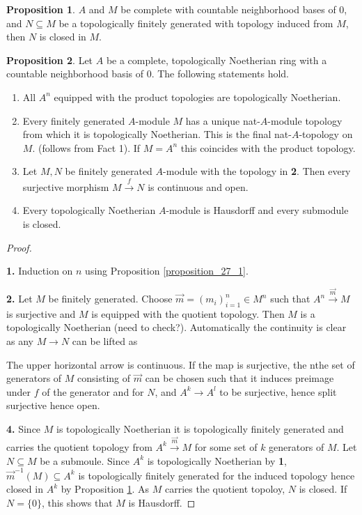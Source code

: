 \documentclass[10pt]{article}
\numberwithin{equation}{section}
\theoremstyle{definition}
\newtheorem{proposition}{Proposition}[subsection]
\begin{document}
\begin{proposition}
    \label{fact_28_3}
    $A$ and $M$ be complete with countable neighborhood bases of $0$, and $N\subseteq M$ be a topologically finitely generated with topology induced from $M$, then $N$ is closed in $M$.
\end{proposition}
\begin{proposition}
    \label{proposition_28_2}
    Let $A$ be a complete, topologically Noetherian ring with a countable neighborhood basis of $0$. The following statements hold.
    \begin{enumerate}[1.]
        \item All $A^n$ equipped with the product topologies are topologically Noetherian.
        \item Every finitely generated $A$-module $M$ has a unique nat-$A$-module topology from which it is topologically Noetherian. This is the final nat-$A$-topology on $M$. (follows from Fact 1). If $M =A^n$ this coincides with the product topology.
        \item Let $M,N$ be finitely generated $A$-module with the topology in \textbf{2}. Then every surjective morphism $M\stackrel{f}{\to}N$ is continuous and open.
        \item Every topologically Noetherian $A$-module is Hausdorff and every submodule is closed.
    \end{enumerate}
\end{proposition}
\begin{proof}$\:$
    \par\textbf{1.} Induction on $n$ using Proposition \ref{proposition_27_1}.
    \par\textbf{2.} Let $M$ be finitely generated. Choose $\vec{m}=(m_i)_{i=1}^n\in M^n$ such that $A^n\stackrel{\vec{m}}{\to}M$ is surjective and $M$ is equipped with the quotient topology. Then $M$ is a topologically Noetherian (need to check?). Automatically the continuity is clear as any $M\to N$ can be lifted as 
    \begin{center}
    \end{center} 
    The upper horizontal arrow is continuous. If the map is surjective, the nthe set of generators of $M$ consisting of $\vec{m}$ can be chosen such that it induces preimage under $f$ of the generator and for $N$, and $A^k\to A^l$ to be surjective, hence split surjective hence open.
    \par\textbf{4.} Since $M$ is topologically Noetherian it is topologically finitely generated and carries the quotient topology from $A^k\stackrel{\vec{m}}{\to}M$ for some set of $k$ generators of $M$. 
    Let $N\subseteq M$ be a submoule. Since $A^k$ is topologically Noetherian by \textbf{1}, $\vec{m}^{-1}(M)\subseteq A^k$ is topologically finitely generated for the induced topology hence closed in $A^k$ by Proposition \ref{fact_28_3}. As $M$ carries the quotient topoloy, $N$ is closed. If $N=\{0\}$, this shows that $M$ is Hausdorff.
\end{proof}
\end{document}
